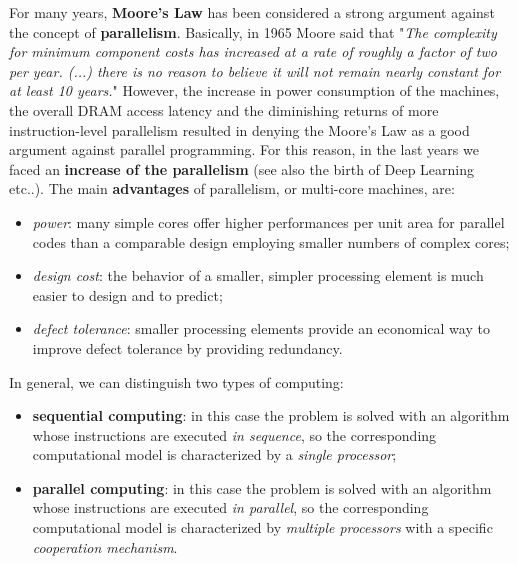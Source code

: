 For many years, \textbf{Moore's Law} has been considered a strong argument against the concept of \textbf{parallelism}. Basically, in 1965 Moore said that "\textit{The complexity for minimum component costs has increased at a rate of roughly a factor of two per year. (...) there is no reason to believe it will not remain nearly constant for at least 10 years.}" However, the increase in power consumption of the machines, the overall DRAM access latency and the diminishing returns of more instruction-level parallelism resulted in denying the Moore's Law as a good argument against parallel programming. For this reason, in the last years we faced an \textbf{increase of the parallelism} (see also the birth of Deep Learning etc..). The main \textbf{advantages} of parallelism, or multi-core machines, are:

\begin{itemize}

    \item \textit{power}: many simple cores offer higher performances per unit area for parallel codes than a comparable design employing smaller numbers of complex cores;

    \item \textit{design cost}: the behavior of a smaller, simpler processing element is much easier to design and to predict;

    \item \textit{defect tolerance}: smaller processing elements provide an economical way to improve defect tolerance by providing redundancy.
    
\end{itemize}

In general, we can distinguish two types of computing:

\begin{itemize}

    \item \textbf{sequential computing}: in this case the problem is solved with an algorithm whose instructions are executed \textit{in sequence}, so the corresponding computational model is characterized by a \textit{single processor};

    \item \textbf{parallel computing}: in this case the problem is solved with an algorithm whose instructions are executed \textit{in parallel}, so the corresponding computational model is characterized by \textit{multiple processors} with a specific \textit{cooperation mechanism}.
\end{itemize}

